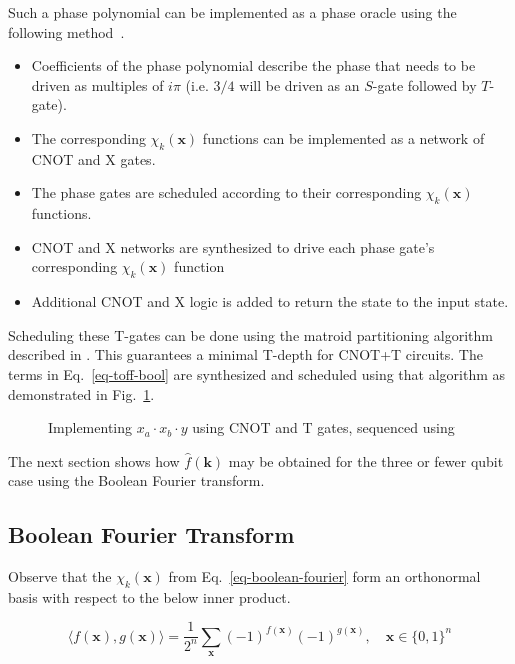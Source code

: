 Such a phase polynomial can be implemented as a phase oracle using the following
method~\cite{amy-meet-in-middle}.

\begin{itemize}
\item Coefficients of the phase polynomial describe the phase that needs to be driven
  as multiples of $i\pi$ (i.e. $3/4$ will be driven as an $S$-gate followed by $T$-gate).
\item The corresponding $\chi_k(\mathbf{x})$ functions can be implemented as a network
  of CNOT and X gates.
\item The phase gates are scheduled according to their corresponding $\chi_k(\mathbf{x})$
  functions.
\item CNOT and X networks are synthesized to drive each phase gate's corresponding
  $\chi_k(\mathbf{x})$ function
\item Additional CNOT and X logic is added to return the state to the input state.
\end{itemize}

Scheduling these T-gates can be done using the matroid partitioning algorithm described in
\cite{bib-amy-matroid}. This guarantees a minimal T-depth for CNOT+T circuits.
The terms in Eq.~\ref{eq-toff-bool} are synthesized and scheduled using that algorithm as
demonstrated in Fig.~\ref{fig-toff-mark-matroid}.

\begin{figure}[t]
  \centering
  \scalebox{0.7} {
    
  }
  \caption{Implementing $x_a \cdot x_b \cdot y$ using CNOT and T gates, sequenced using~\cite{bib-amy-matroid}}
  \label{fig-toff-mark-matroid}
  \vspace{-0.5cm}
\end{figure}

The next section shows how $\hat{f}(\mathbf{k})$ may be obtained for the three or fewer qubit case using the
Boolean Fourier transform.

\subsection{Boolean Fourier Transform}
\label{Pre:Four}
Observe that the $\chi_k(\mathbf{x})$ from Eq.~\ref{eq-boolean-fourier} form an orthonormal basis with respect
to the below inner product.

\begin{equation}
  \label{eq-inner-prod}
  \langle f(\mathbf{x}) , g(\mathbf{x}) \rangle = \frac{1}{2^n} \sum_{\mathbf{x}} (-1)^{f(\mathbf{x})} (-1)^{g(\mathbf{x})}, \quad \mathbf{x} \in \{0,1\}^n
\end{equation}

